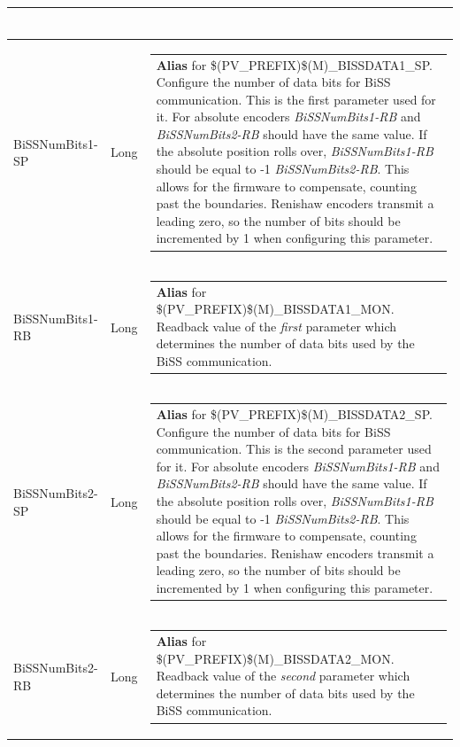 \documentclass[openany]{article}
\begin{document}
\begin{longtable}{| m{4.5cm} m{2.5cm}  m{8.5cm} |}
\begin{tabular}{@{}m{6cm}@{}}
            \end{tabular} \hypertarget{pv:biss-num-bits-1}{}\\ \hline
        BiSSNumBits1-SP & Long & \begin{tabular}{@{}m{6cm}@{}}
                \textbf{\color{blue} Alias} for \$(PV\_PREFIX)\$(M)\_BISSDATA1\_SP. Configure the number of data bits for BiSS communication. This is the first parameter used for it. For absolute encoders \emph{BiSSNumBits1-RB} and \emph{BiSSNumBits2-RB} should have the same value. If the absolute position rolls over, \emph{BiSSNumBits1-RB} should be equal to -1 $\times$ \emph{BiSSNumBits2-RB}. This allows for the firmware to compensate, counting past the boundaries. Renishaw encoders transmit a leading zero, so the number of bits should be incremented by 1 when configuring this parameter.
            \end{tabular} \hypertarget{}{}\\ \hline
        BiSSNumBits1-RB & Long & \begin{tabular}{@{}m{6cm}@{}}
                \textbf{\color{blue} Alias} for \$(PV\_PREFIX)\$(M)\_BISSDATA1\_MON. Readback value of the \emph{first} parameter which determines the number of data bits used by the BiSS communication.
            \end{tabular} \hypertarget{pv:biss-num-bits-2}{}\\ \hline
        BiSSNumBits2-SP & Long & \begin{tabular}{@{}m{6cm}@{}}
                \textbf{\color{blue} Alias} for \$(PV\_PREFIX)\$(M)\_BISSDATA2\_SP. Configure the number of data bits for BiSS communication. This is the second parameter used for it. For absolute encoders \emph{BiSSNumBits1-RB} and \emph{BiSSNumBits2-RB} should have the same value. If the absolute position rolls over, \emph{BiSSNumBits1-RB} should be equal to -1 $\times$ \emph{BiSSNumBits2-RB}. This allows for the firmware to compensate, counting past the boundaries. Renishaw encoders transmit a leading zero, so the number of bits should be incremented by 1 when configuring this parameter.
            \end{tabular} \hypertarget{}{}\\ \hline
        BiSSNumBits2-RB & Long & \begin{tabular}{@{}m{6cm}@{}}
                \textbf{\color{blue} Alias} for \$(PV\_PREFIX)\$(M)\_BISSDATA2\_MON. Readback value of the \emph{second} parameter which determines the number of data bits used by the BiSS communication.

\end{tabular}
\end{longtable}
\end{document}
